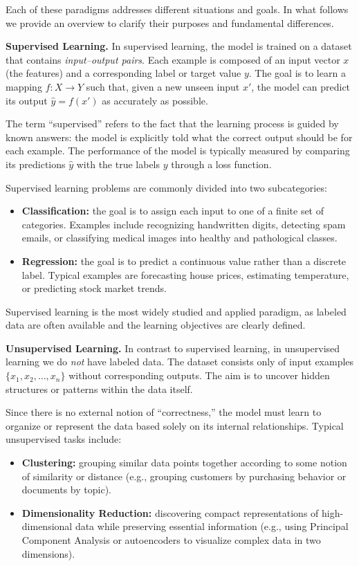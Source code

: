 \documentclass[10pt, letterpaper]{report}
\begin{document}
Each of these paradigms addresses different situations and goals. In what follows we provide an overview to clarify their purposes and fundamental differences.

\bigskip
\textbf{Supervised Learning.}
In supervised learning, the model is trained on a dataset that contains \emph{input–output pairs}.
Each example is composed of an input vector $x$ (the features) and a corresponding label or target value $y$.
The goal is to learn a mapping $f: X \rightarrow Y$ such that, given a new unseen input $x'$, the model can predict its output $\hat y = f(x')$ as accurately as possible.

The term ``supervised'' refers to the fact that the learning process is guided by known answers: the model is explicitly told what the correct output should be for each example.
The performance of the model is typically measured by comparing its predictions $\hat y$ with the true labels $y$ through a loss function.

Supervised learning problems are commonly divided into two subcategories:
\begin{itemize}
	\item \textbf{Classification:} the goal is to assign each input to one of a finite set of categories.
	      Examples include recognizing handwritten digits, detecting spam emails, or classifying medical images into healthy and pathological classes.
	\item \textbf{Regression:} the goal is to predict a continuous value rather than a discrete label.
	      Typical examples are forecasting house prices, estimating temperature, or predicting stock market trends.
\end{itemize}

Supervised learning is the most widely studied and applied paradigm, as labeled data are often available and the learning objectives are clearly defined.

\bigskip
\textbf{Unsupervised Learning.}
In contrast to supervised learning, in unsupervised learning we do \emph{not} have labeled data.
The dataset consists only of input examples $\{x_1, x_2, \dots, x_n\}$ without corresponding outputs.
The aim is to uncover hidden structures or patterns within the data itself.

Since there is no external notion of ``correctness,'' the model must learn to organize or represent the data based solely on its internal relationships.
Typical unsupervised tasks include:
\begin{itemize}
	\item \textbf{Clustering:} grouping similar data points together according to some notion of similarity or distance (e.g., grouping customers by purchasing behavior or documents by topic).
	\item \textbf{Dimensionality Reduction:} discovering compact representations of high-dimensional data while preserving essential information (e.g., using Principal Component Analysis or autoencoders to visualize complex data in two dimensions).
\end{itemize}
\end{document}
